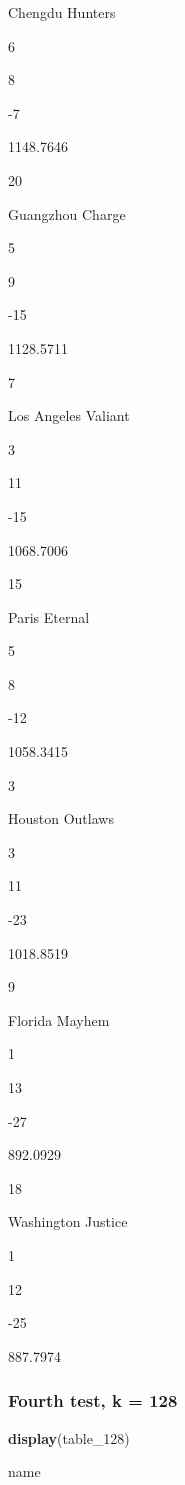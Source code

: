 \documentclass[]{article}
\newenvironment{Shaded}{\begin{snugshade}}{\end{snugshade}}
\newcommand{\KeywordTok}[1]{\textcolor[rgb]{0.13,0.29,0.53}{\textbf{#1}}}
\newcommand{\DecValTok}[1]{\textcolor[rgb]{0.00,0.00,0.81}{#1}}
\newcommand{\NormalTok}[1]{#1}
\begin{document}
Chengdu Hunters

6

8

{-7}

{1148.7646}

20

Guangzhou Charge

5

9

{-15}

{1128.5711}

7

Los Angeles Valiant

3

11

{-15}

{1068.7006}

15

Paris Eternal

5

8

{-12}

{1058.3415}

3

Houston Outlaws

3

11

{-23}

{1018.8519}

9

Florida Mayhem

1

13

{-27}

{892.0929}

18

Washington Justice

1

12

{-25}

{887.7974}

\subsubsection{Fourth test, k = 128}\label{fourth-test-k-128}

\begin{Shaded}
\begin{Highlighting}[]
\KeywordTok{display}\NormalTok{(table_}\DecValTok{128}\NormalTok{)}
\end{Highlighting}
\end{Shaded}

name
\end{document}
